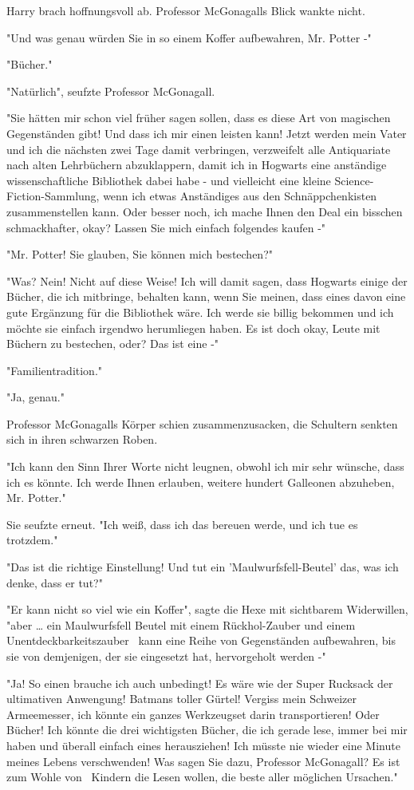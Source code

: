 {Harry brach hoffnungsvoll ab. Professor McGonagalls Blick wankte nicht.

"Und was genau würden Sie in so einem Koffer aufbewahren, Mr. Potter -"

"Bücher."

"Natürlich", seufzte Professor McGonagall.

"Sie hätten mir schon viel früher sagen sollen, dass es diese Art von magischen Gegenständen gibt! Und dass ich mir einen leisten kann! Jetzt werden mein Vater und ich die nächsten zwei Tage damit verbringen, verzweifelt alle Antiquariate nach alten Lehrbüchern abzuklappern, damit ich in Hogwarts eine anständige wissenschaftliche Bibliothek dabei habe - und vielleicht eine kleine Science-Fiction-Sammlung, wenn ich etwas Anständiges aus den Schnäppchenkisten zusammenstellen kann. Oder besser noch, ich mache Ihnen den Deal ein bisschen schmackhafter, okay? Lassen Sie mich einfach folgendes kaufen -"

"Mr. Potter! Sie glauben, Sie können mich bestechen?"

"Was? Nein! Nicht auf diese Weise! Ich will damit sagen, dass Hogwarts einige der Bücher, die ich mitbringe, behalten kann, wenn Sie meinen, dass eines davon eine gute Ergänzung für die Bibliothek wäre. Ich werde sie billig bekommen und ich möchte sie einfach irgendwo herumliegen haben. Es ist doch okay, Leute mit Büchern zu bestechen, oder? Das ist eine -"

"Familientradition."

"Ja, genau."

Professor McGonagalls Körper schien zusammenzusacken, die Schultern senkten sich in ihren schwarzen Roben.

"Ich kann den Sinn Ihrer Worte nicht leugnen, obwohl ich mir sehr wünsche, dass ich es könnte. Ich werde Ihnen erlauben, weitere hundert Galleonen abzuheben, Mr. Potter."

Sie seufzte erneut. "Ich weiß, dass ich das bereuen werde, und ich tue es trotzdem."

"Das ist die richtige Einstellung! Und tut ein 'Maulwurfsfell-Beutel' das, was ich denke, dass er tut?"

"Er kann nicht so viel wie ein Koffer", sagte die Hexe mit sichtbarem Widerwillen, "aber … ein Maulwurfsfell Beutel mit einem Rückhol-Zauber und einem Unentdeckbarkeitszauber ~kann eine Reihe von Gegenständen aufbewahren, bis sie von demjenigen, der sie eingesetzt hat, hervorgeholt werden -"

"Ja! So einen brauche ich auch unbedingt! Es wäre wie der Super Rucksack der ultimativen Anwengung! Batmans toller Gürtel! Vergiss mein Schweizer Armeemesser, ich könnte ein ganzes Werkzeugset darin transportieren! Oder Bücher! Ich könnte die drei wichtigsten Bücher, die ich gerade lese, immer bei mir haben und überall einfach eines herausziehen! Ich müsste nie wieder eine Minute meines Lebens verschwenden! Was sagen Sie dazu, Professor McGonagall? Es ist zum Wohle von ~Kindern die Lesen wollen, die beste aller möglichen Ursachen."

}
